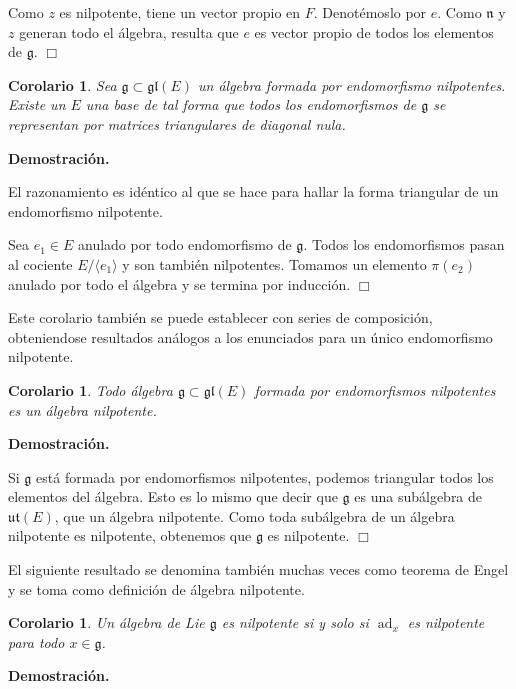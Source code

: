 \documentclass[a4paper,draft,12pt]{article}
\newtheorem{cor}[teo]{Corolario}%
\newcommand{\dem}{\noindent \textbf{Demostración. }\vspace{0.3 cm}}%
\newcommand{\g}{\mathfrak{g}}%
\newcommand{\fin}{ $\Box $ \vspace{0.4 cm}}
\DeclareMathOperator{\ad}{ad}  %
\begin{document}
Como $z$ es nilpotente, tiene un vector propio en $F$.  Denotémoslo por $e$. Como $\mathfrak{n}$ y $z$ generan todo el álgebra, resulta que $e$ es vector propio de todos los elementos de $\g$.  \fin 

\begin{cor}

Sea $\g \subset \mathfrak{gl}(E)$ un álgebra formada por endomorfismo nilpotentes.  Existe un $E$ una base de tal forma que todos los endomorfismos de $\g$ se representan por matrices triangulares de diagonal nula.

\end{cor}

\dem

El razonamiento es idéntico al que se hace para hallar la forma triangular de un endomorfismo nilpotente.

Sea $e_1 \in E$ anulado por todo endomorfismo de $\g$.  Todos los endomorfismos pasan al cociente $E/\langle e_1\rangle$ y son también nilpotentes.  Tomamos un elemento $\pi(e_2)$ anulado por todo el álgebra y se termina por inducción.  \fin

Este corolario también se puede establecer con series de composición, obteniendose resultados análogos a los enunciados para un único endomorfismo nilpotente.

\begin{cor}

Todo álgebra $\g \subset \mathfrak{gl}(E)$ formada por endomorfismos nilpotentes es un álgebra nilpotente.

\end{cor}

\dem

Si $\g$ está formada por endomorfismos nilpotentes, podemos triangular todos los elementos del álgebra.  Esto es lo mismo que decir que $\g$ es una subálgebra de $\mathfrak{ut}(E)$, que un álgebra nilpotente.  Como toda subálgebra de un álgebra nilpotente es nilpotente, obtenemos que $\g$ es nilpotente.  \fin

El siguiente resultado se denomina también muchas veces como teorema de Engel y se toma como definición de álgebra nilpotente.

\begin{cor}

Un álgebra de Lie $\g$ es nilpotente si y solo si $\ad_x$ es nilpotente para todo $x \in \g$.

\end{cor}

\dem
\end{document}
